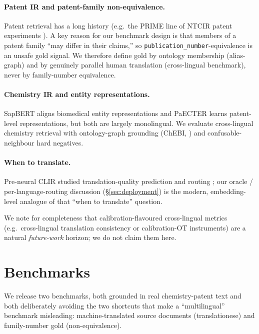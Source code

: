 \documentclass[11pt]{article}
\begin{document}
\paragraph{Patent IR and patent-family non-equivalence.}
Patent retrieval has a long history (e.g.\ the PRIME line of NTCIR patent
experiments \citep{prime2002}). A key reason for our benchmark design is that
members of a patent family ``may differ in their claims,'' so
\texttt{publication\_number}-equivalence is an unsafe gold signal. We therefore
define gold by ontology membership (alias-graph) and by genuinely parallel
human translation (cross-lingual benchmark), never by family-number equivalence.

\paragraph{Chemistry IR and entity representations.}
SapBERT \citep{sapbert2021} aligns biomedical entity representations and PaECTER
\citep{paecter2024} learns patent-level representations, but both are largely
monolingual. We evaluate cross-lingual chemistry retrieval with ontology-graph
grounding (ChEBI, \citealp{chebi2016}) and confusable-neighbour hard negatives.

\paragraph{When to translate.}
Pre-neural CLIR studied translation-quality prediction and routing
\citep{kishida2008}; our oracle / per-language-routing discussion
(\S\ref{sec:deployment}) is the modern, embedding-level analogue of that
``when to translate'' question.

We note for completeness that calibration-flavoured cross-lingual metrics
(e.g.\ cross-lingual translation consistency or calibration-OT instruments)
are a natural \emph{future-work} horizon; we do not claim them here.

\section{Benchmarks}
\label{sec:benchmarks}

We release two benchmarks, both grounded in real chemistry-patent text and both
deliberately avoiding the two shortcuts that make a ``multilingual'' benchmark
misleading: machine-translated source documents (translationese) and
family-number gold (non-equivalence).
\end{document}
